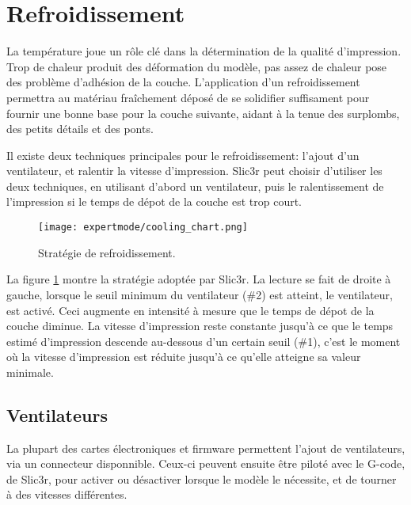 
\section{Refroidissement} %
\label{sec:cooling}

La temp\'erature joue un r\^ole cl\'e dans la d\'etermination de la qualit\'e d'impression. Trop de chaleur produit des d\'eformation du mod\`ele, pas assez de chaleur pose des probl\`eme d'adh\'esion de la couche. L'application d'un refroidissement permettra au mat\'eriau fra\^ichement d\'epos\'e de se solidifier suffisament pour fournir une bonne base pour la couche suivante, aidant \`a la tenue des surplombs, des petits d\'etails et des ponts.

Il existe deux techniques principales pour le refroidissement: l'ajout d'un ventilateur, et ralentir la vitesse d'impression. Slic3r peut choisir d'utiliser les deux techniques, en utilisant d'abord un ventilateur, puis le ralentissement de l'impression si le temps de d\'epot de la couche est trop court.

\begin{figure}[H]
\centering
\texttt{[image: expertmode/cooling\_chart.png]}
\caption{Strat\'egie de refroidissement.}
\label{fig:cooling_chart}
\end{figure}

La figure \ref{fig:cooling_chart} montre la strat\'egie adopt\'ee par Slic3r. La lecture se fait de droite \`a gauche, lorsque le seuil minimum du ventilateur (\#2) est atteint, le ventilateur, est activ\'e. Ceci augmente en intensit\'e \`a mesure que le temps de d\'epot de la couche diminue. La vitesse d'impression reste constante jusqu'\`a ce que le temps estim\'e d'impression descende au-dessous d'un certain seuil (\#1), c'est le moment o\`u la vitesse d'impression est r\'eduite jusqu'\`a ce qu'elle atteigne sa valeur minimale.

\subsection{Ventilateurs} %
\label{sub:fans}
La plupart des cartes \'electroniques et firmware permettent l'ajout de ventilateurs, via un connecteur disponnible. Ceux-ci peuvent ensuite \^etre pilot\'e avec le G-code, de Slic3r, pour activer ou d\'esactiver lorsque le mod\`ele le n\'ecessite, et de tourner \`a des vitesses diff\'erentes.

